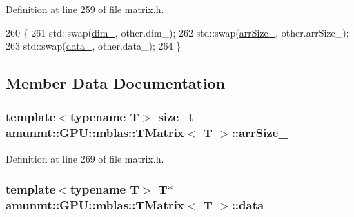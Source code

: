 Definition at line 259 of file matrix.\+h.


\begin{DoxyCode}
260     \{
261       std::swap(\hyperlink{classamunmt_1_1GPU_1_1mblas_1_1TMatrix_ad9811151546f114cf3f55c80f384087e}{dim\_}, other.dim\_);
262       std::swap(\hyperlink{classamunmt_1_1GPU_1_1mblas_1_1TMatrix_ae5fabb47536114e44975883ccf2d9c89}{arrSize\_}, other.arrSize\_);
263       std::swap(\hyperlink{classamunmt_1_1GPU_1_1mblas_1_1TMatrix_a277cd179551a588798f9c4e3269fb47a}{data\_}, other.data\_);
264     \}
\end{DoxyCode}


\subsection{Member Data Documentation}
\subsubsection[{\texorpdfstring{arr\+Size\+\_\+}{arrSize_}}]{\setlength{\rightskip}{0pt plus 5cm}template$<$typename T$>$ size\+\_\+t {\bf amunmt\+::\+G\+P\+U\+::mblas\+::\+T\+Matrix}$<$ T $>$\+::arr\+Size\+\_\+\hspace{0.3cm}{\ttfamily [private]}}\hypertarget{classamunmt_1_1GPU_1_1mblas_1_1TMatrix_ae5fabb47536114e44975883ccf2d9c89}{}\label{classamunmt_1_1GPU_1_1mblas_1_1TMatrix_ae5fabb47536114e44975883ccf2d9c89}


Definition at line 269 of file matrix.\+h.

\subsubsection[{\texorpdfstring{data\+\_\+}{data_}}]{\setlength{\rightskip}{0pt plus 5cm}template$<$typename T$>$ T$\ast$ {\bf amunmt\+::\+G\+P\+U\+::mblas\+::\+T\+Matrix}$<$ T $>$\+::data\+\_\+\hspace{0.3cm}{\ttfamily [private]}}\hypertarget{classamunmt_1_1GPU_1_1mblas_1_1TMatrix_a277cd179551a588798f9c4e3269fb47a}{}\label{classamunmt_1_1GPU_1_1mblas_1_1TMatrix_a277cd179551a588798f9c4e3269fb47a}


